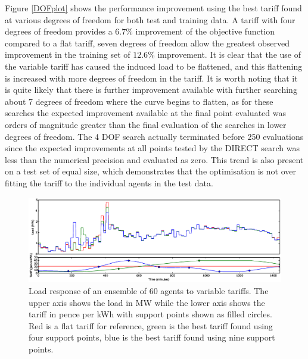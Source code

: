 \documentclass[a4paper, 10 pt, conference]{ieeeconf}  %
\begin{document}
Figure \ref{DOFplot} shows the performance improvement using the best tariff found at various degrees of freedom for both test and training data. A tariff with four degrees of freedom provides a $6.7\%$ improvement of the objective function compared to a flat tariff, seven degrees of freedom allow the greatest observed improvement in the training set of $12.6\%$ improvement. It is clear that the use of the variable tariff has caused the induced load to be flattened, and this flattening is increased with more degrees of freedom in the tariff. It is worth noting that it is quite likely that there is further improvement available with further searching about 7 degrees of freedom where the curve begins to flatten, as for these searches the expected improvement available at the final point evaluated was orders of magnitude greater than the final evaluation of the searches in lower degrees of freedom. The 4 DOF search actually terminated before 250 evaluations since the expected improvements at all points tested by the DIRECT search was less than the numerical precision and evaluated as zero. This trend is also present on a test set of equal size, which demonstrates that the optimisation is not over fitting the tariff to the individual agents in the test data. 

\begin{figure}[htbp]

\centering
\includegraphics[width=\textwidth,trim =4cm 12cm 4cm 2cm,clip=True]{f1.eps}
\caption{Load response of an ensemble of 60 agents to variable tariffs. The upper axis shows the load in MW while the lower axis shows the tariff in pence per kWh with support points shown as filled circles. Red is a flat tariff for reference, green is the best tariff found using four support points, blue is the best tariff found using nine support points.}
\label{loadcurve2}
\end{figure}
\end{document}
